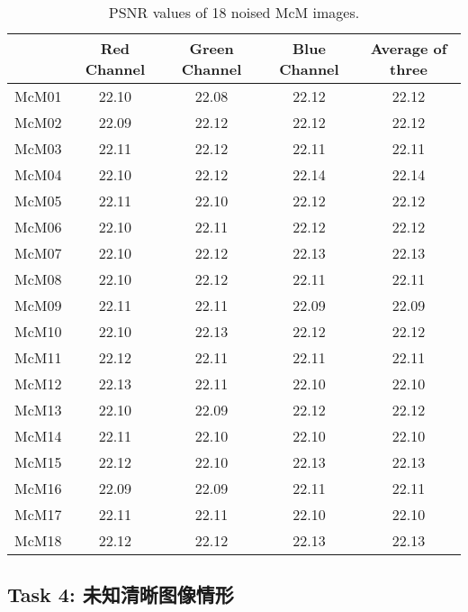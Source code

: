 \documentclass[10.5pt]{myarticle}
\begin{document}
\begin{table}[H]
	\centering
	\caption{PSNR values of 18 noised McM images.}
	\label{tab:noisy_task3}
	\begin{tabular}{|c|c|c|c|c|}
	\hline
		 & Red Channel & Green Channel & Blue Channel & Average of three \\ \hline
		McM01 & 22.10 & 22.08 & 22.12 & 22.12 \\ \hline
		McM02 & 22.09 & 22.12 & 22.12 & 22.12 \\ \hline
		McM03 & 22.11 & 22.12 & 22.11 & 22.11 \\ \hline
		McM04 & 22.10 & 22.12 & 22.14 & 22.14 \\ \hline
		McM05 & 22.11 & 22.10 & 22.12 & 22.12 \\ \hline
		McM06 & 22.10 & 22.11 & 22.12 & 22.12 \\ \hline
		McM07 & 22.10 & 22.12 & 22.13 & 22.13 \\ \hline
		McM08 & 22.10 & 22.12 & 22.11 & 22.11 \\ \hline
		McM09 & 22.11 & 22.11 & 22.09 & 22.09 \\ \hline
		McM10 & 22.10 & 22.13 & 22.12 & 22.12 \\ \hline
		McM11 & 22.12 & 22.11 & 22.11 & 22.11 \\ \hline
		McM12 & 22.13 & 22.11 & 22.10 & 22.10 \\ \hline
		McM13 & 22.10 & 22.09 & 22.12 & 22.12 \\ \hline
		McM14 & 22.11 & 22.10 & 22.10 & 22.10 \\ \hline
		McM15 & 22.12 & 22.10 & 22.13 & 22.13 \\ \hline
		McM16 & 22.09 & 22.09 & 22.11 & 22.11 \\ \hline
		McM17 & 22.11 & 22.11 & 22.10 & 22.10 \\ \hline
		McM18 & 22.12 & 22.12 & 22.13 & 22.13 \\ \hline
	\end{tabular}
\end{table}


\clearpage


\subsection{Task 4: 未知清晰图像情形}
\end{document}
